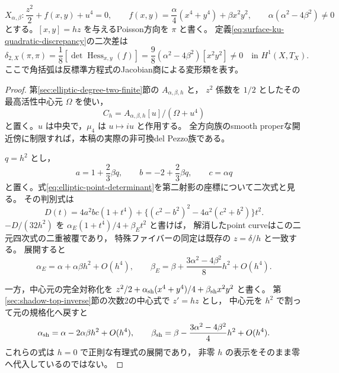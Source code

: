\begin{theorem}[次数2の二次差]
\label{thm:ku-degree-two-quadratic-obstruction}
\[
 X_{\alpha,\beta}:
 \frac{z^2}{2}+f(x,y)+u^4=0,
 \qquad f(x,y)=\frac\alpha4(x^4+y^4)+\beta x^2y^2,
 \qquad \alpha(\alpha^2-4\beta^2)\ne0
\]
とする。$[x,y]=hz$ を与えるPoisson方向を $\pi$ と書く。
定義\eqref{eq:surface-ku-quadratic-discrepancy}の二次差は
\begin{equation}\label{eq:ku-degree-two-hessian-obstruction}
 \delta_{2,X}(\pi,\pi)
  =\frac18[\det\operatorname{Hess}_{x,y}(f)]
  =\frac98(\alpha^2-4\beta^2)[x^2y^2]
  \ne0
  \quad\text{in }H^1(X,T_X).
\end{equation}
ここで角括弧は反標準方程式のJacobian商による変形類を表す。
\end{theorem}
\begin{proof}
第\ref{sec:elliptic-degree-two-finite}節の $A_{\alpha,\beta,h}$ と，
$z^2$ 係数を $1/2$ としたその最高活性中心元 $\Omega$ を使い，
\[
 C_h=A_{\alpha,\beta,h}[u]/(\Omega+u^4)
\]
と置く。$u$ は中央で，$\mu_4$ は $u\mapsto iu$ と作用する。
全方向族のsmooth properな開近傍に制限すれば，本稿の実際の非可換del Pezzo族である。

$q=h^2$ とし，
\[
 a=1+\frac23\beta q,\qquad b=-2+\frac23\beta q,\qquad c=\alpha q
\]
と置く。式\eqref{eq:elliptic-point-determinant}を第二射影の座標について二次式と見る。
その判別式は
\begin{equation}\label{eq:ku-degree-two-point-discriminant}
 D(t)=4a^2bc(1+t^4)
       +\{(c^2-b^2)^2-4a^2(c^2+b^2)\}t^2.
\end{equation}
$-D/(32h^2)$ を
$\alpha_E(1+t^4)/4+\beta_Et^2$ と書けば，
解消したpoint curveはこの二元四次式の二重被覆であり，
特殊ファイバーの同定は既存の $z=\delta/h$ と一致する。
展開すると
\begin{equation}\label{eq:ku-degree-two-point-jet}
 \alpha_E=\alpha+\alpha\beta h^2+O(h^4),\qquad
 \beta_E=\beta+\frac{3\alpha^2-4\beta^2}{8}h^2+O(h^4).
\end{equation}

一方，中心元の完全対称化を
$z^2/2+\alpha_{\rm sh}(x^4+y^4)/4+\beta_{\rm sh}x^2y^2$ と書く。
第\ref{sec:shadow-top-inverse}節の次数2の中心式で $z'=hz$ とし，
中心元を $h^2$ で割って元の規格化へ戻すと
\begin{equation}\label{eq:ku-degree-two-shadow-jet}
 \alpha_{\rm sh}=\alpha-2\alpha\beta h^2+O(h^4),\qquad
 \beta_{\rm sh}=\beta-\frac{3\alpha^2-4\beta^2}{4}h^2+O(h^4).
\end{equation}
これらの式は $h=0$ で正則な有理式の展開であり，
非零 $h$ の表示をそのまま零へ代入しているのではない。


\end{proof}
